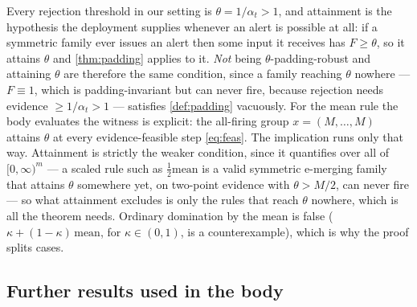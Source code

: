 \documentclass[conference]{IEEEtran}
\newcommand{\ceil}{M}
\newcommand{\alphat}{\alpha_t}
\begin{document}
Every rejection threshold in our setting is $\theta=1/\alphat>1$, and attainment is the hypothesis the
deployment supplies whenever an alert is possible at all: if a symmetric family ever issues an alert then
some input it receives has $F\ge\theta$, so it attains $\theta$ and \cref{thm:padding} applies to it.
\emph{Not} being $\theta$-padding-robust and attaining $\theta$ are therefore the same condition, since a
family reaching $\theta$ nowhere --- $F\equiv1$, which is padding-invariant but can never fire, because
rejection needs evidence $\ge1/\alphat>1$ --- satisfies \cref{def:padding} vacuously. For the mean rule
the body evaluates the witness is explicit: the all-firing group $x=(\ceil,\ldots,\ceil)$ attains
$\theta$ at every evidence-feasible step \eqref{eq:feas}. The implication runs only that way. Attainment is strictly the weaker condition, since it quantifies over
all of $[0,\infty)^m$ --- a scaled rule such as $\tfrac12\mathrm{mean}$ is a valid symmetric e-merging
family that attains $\theta$ somewhere yet, on two-point evidence with $\theta>\ceil/2$, can never fire
--- so what attainment excludes is only the rules that reach $\theta$ nowhere, which is all the theorem
needs. Ordinary domination by the mean is false ($\kappa+(1-\kappa)\,\mathrm{mean}$, for
$\kappa\in(0,1)$, is a counterexample), which is why the proof splits cases.

\subsection{Further results used in the body}\label{app:further}
\end{document}
